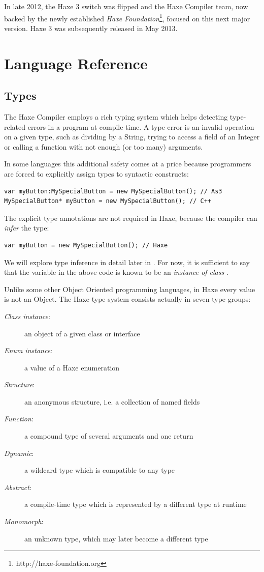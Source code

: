 \documentclass{haxe}
\begin{document}
In late 2012, the Haxe 3 switch was flipped and the Haxe Compiler team, now backed by the newly established \emph{Haxe Foundation}\footnote{http://haxe-foundation.org}, focused on this next major version. Haxe 3 was subsequently released in May 2013.

\part{Language Reference}

\chapter{Types}
\label{types}

The Haxe Compiler employs a rich typing system which helps detecting type-related errors in a program at compile-time. A type error is an invalid operation on a given type, such as dividing by a String, trying to access a field of an Integer or calling a function with not enough (or too many) arguments.

In some languages this additional safety comes at a price because programmers are forced to explicitly assign types to syntactic constructs:

\begin{lstlisting}
var myButton:MySpecialButton = new MySpecialButton(); // As3
MySpecialButton* myButton = new MySpecialButton(); // C++ 
\end{lstlisting}
The explicit type annotations are not required in Haxe, because the compiler can \emph{infer} the type:

\begin{lstlisting}
var myButton = new MySpecialButton(); // Haxe
\end{lstlisting}
We will explore type inference in detail later in . For now, it is sufficient to say that the variable  in the above code is known to be an \emph{instance of class} . 

Unlike some other Object Oriented programming languages, in Haxe every value is not an Object. The Haxe type system consists actually in seven type groups:

\begin{description}
 \item[\emph{Class instance}:] an object of a given class or interface
 \item[\emph{Enum instance}:] a value of a Haxe enumeration
 \item[\emph{Structure}:] an anonymous structure, i.e. a collection of named fields
 \item[\emph{Function}:] a compound type of several arguments and one return
 \item[\emph{Dynamic}:] a wildcard type which is compatible to any type
 \item[\emph{Abstract}:] a compile-time type which is represented by a different type at runtime
 \item[\emph{Monomorph}:] an unknown type, which may later become a different type
\end{description}
\end{document}
